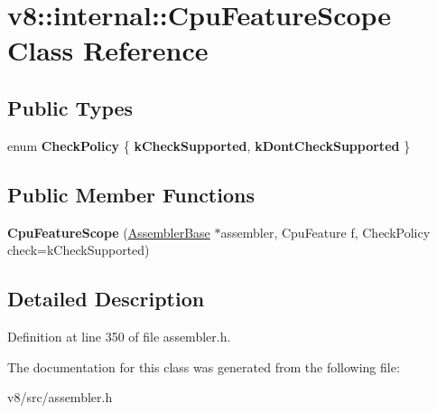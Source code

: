 \hypertarget{classv8_1_1internal_1_1CpuFeatureScope}{}\section{v8\+:\+:internal\+:\+:Cpu\+Feature\+Scope Class Reference}
\label{classv8_1_1internal_1_1CpuFeatureScope}
\subsection*{Public Types}
\begin{DoxyCompactItemize}
\item 
\mbox{\label{classv8_1_1internal_1_1CpuFeatureScope_a02b36a003daf015dcc3c9e295f937da1}} 
enum {\bfseries Check\+Policy} \{ {\bfseries k\+Check\+Supported}, 
{\bfseries k\+Dont\+Check\+Supported}
 \}
\end{DoxyCompactItemize}
\subsection*{Public Member Functions}
\begin{DoxyCompactItemize}
\item 
\mbox{\label{classv8_1_1internal_1_1CpuFeatureScope_a137d49f790d2a5aabcc80284172614be}} 
{\bfseries Cpu\+Feature\+Scope} (\mbox{\hyperlink{classv8_1_1internal_1_1AssemblerBase}{Assembler\+Base}} $\ast$assembler, Cpu\+Feature f, Check\+Policy check=k\+Check\+Supported)
\end{DoxyCompactItemize}


\subsection{Detailed Description}


Definition at line 350 of file assembler.\+h.



The documentation for this class was generated from the following file\+:\begin{DoxyCompactItemize}
\item 
v8/src/assembler.\+h\end{DoxyCompactItemize}
